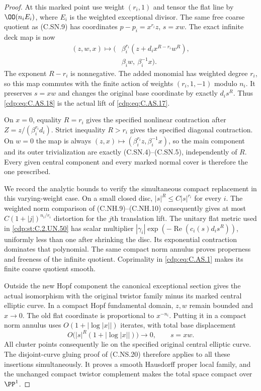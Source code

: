 \begin{proof}
At this marked point use weight
$(r_i,1)$ and tensor the flat line
by $\OO(n_iE_i)$, where $E_i$ is
the weighted exceptional divisor.
The same free coarse quotient as
(C.SN.9) has coordinates
$p-p_i=x^{r_i}z$, $s=xw$.
The exact infinite deck map is now
\[
 \begin{split}
 (z,w,x)\longmapsto\bigl(&
   \beta_i^{r_i}(z+d_i x^{R-r_i}w^R),\\
   &\beta_iw,\ \beta_i^{-1}x\bigr).
 \end{split}                                             \tag{C.AS.18}\label{cdp:eq:C.AS.18}
\]
The exponent $R-r_i$ is nonnegative.
The added monomial has weighted degree
$r_i$, so this map commutes with the
finite action of weights
$(r_i,1,-1)$ modulo $n_i$. It preserves
$s=xw$ and changes the original base
coordinate by exactly $d_i s^R$.
Thus \eqref{cdp:eq:C.AS.18} is the actual lift
of \eqref{cdp:eq:C.AS.17}.

On $x=0$, equality $R=r_i$ gives the
specified nonlinear contraction after
$Z=z/(\beta_i^{r_i}d_i)$. Strict
inequality $R>r_i$ gives the specified
diagonal contraction. On $w=0$ the
map is always
$(z,x)\mapsto(\beta_i^{r_i}z,\beta_i^{-1}x)$,
so the main component and its outer
trivialization are exactly
(C.SN.4)--(C.SN.5), independently of
$R$. Every given central component
and every marked normal cover is
therefore the one prescribed.

We record the analytic bounds to
verify the simultaneous compact
replacement in this varying-weight
case. On a small closed disc,
$|s|^R\le C|s|^{r_i}$ for every $i$.
The weighted norm comparison of
(C.NH.9)--(C.NH.10) consequently
gives at most
$C(1+|j|)^{n_i/r_i}$ distortion
for the $j$th translation lift.
The unitary flat metric used in
\ref{cdp:st:C.2.UN.50} has scalar multiplier
$|\gamma_i|\exp(-\operatorname{Re}(c_i(s)d_i s^R))$,
uniformly less than one after
shrinking the disc. Its exponential
contraction dominates that polynomial.
The same compact norm annulus proves
properness and freeness of the
infinite quotient. Coprimality in
\eqref{cdp:eq:C.AS.1} makes its finite coarse
quotient smooth.

Outside the new Hopf component the
canonical exceptional section gives
the actual isomorphism with the
original twistor family minus its
marked central elliptic curve.
In a compact Hopf fundamental domain,
$z,w$ remain bounded and $x\to0$.
The old flat coordinate is proportional
to $x^{-n_i}$. Putting it in a compact
norm annulus uses
$O(1+|\log|x||)$ iterates, with total
base displacement
\[
                   O\bigl(|s|^R(1+|\log|x||)\bigr)
                          \longrightarrow0,
                         \qquad s=xw.                   \tag{C.AS.19}\label{cdp:eq:C.AS.19}
\]
All cluster points consequently lie
on the specified original central
elliptic curve. The disjoint-curve
gluing proof of (C.NS.20) therefore
applies to all these insertions
simultaneously. It proves a smooth
Hausdorff proper local family, and
the unchanged compact twistor
complement makes the total space
compact over $\PP^1$.


\end{proof}
